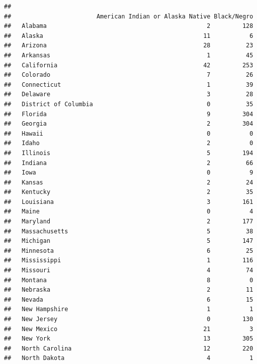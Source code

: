 \documentclass[]{book}
\theoremstyle{definition}
\theoremstyle{definition}
\theoremstyle{definition}
\theoremstyle{remark}
\begin{document}
\begin{verbatim}
##                       
##                        American Indian or Alaska Native Black/Negro
##   Alabama                                             2         128
##   Alaska                                             11           6
##   Arizona                                            28          23
##   Arkansas                                            1          45
##   California                                         42         253
##   Colorado                                            7          26
##   Connecticut                                         1          39
##   Delaware                                            3          28
##   District of Columbia                                0          35
##   Florida                                             9         304
##   Georgia                                             2         304
##   Hawaii                                              0           0
##   Idaho                                               2           0
##   Illinois                                            5         194
##   Indiana                                             2          66
##   Iowa                                                0           9
##   Kansas                                              2          24
##   Kentucky                                            2          35
##   Louisiana                                           3         161
##   Maine                                               0           4
##   Maryland                                            2         177
##   Massachusetts                                       5          38
##   Michigan                                            5         147
##   Minnesota                                           6          25
##   Mississippi                                         1         116
##   Missouri                                            4          74
##   Montana                                             8           0
##   Nebraska                                            2          11
##   Nevada                                              6          15
##   New Hampshire                                       1           1
##   New Jersey                                          0         130
##   New Mexico                                         21           3
##   New York                                           13         305
##   North Carolina                                     12         220
##   North Dakota                                        4           1

\end{verbatim}
\end{document}

